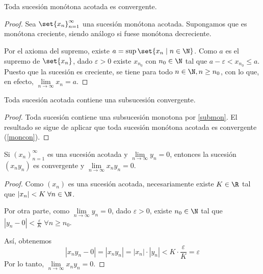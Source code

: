 \begin{proposition}
	\label{moncon}
	Toda sucesión monótona acotada es convergente.
\end{proposition}
\begin{proof}
	Sea \(\set{x_n}^{\infty}_{n = 1} \) una sucesión monótona acotada. Supongamos que es monótona creciente, siendo análogo si fuese monótona decreciente. 
	
	Por el axioma del supremo, existe \(a = \sup \set{x_n \mid n \in \N }\). Como \(a \) es el supremo de \(\set{x_n}\), dado \(\varepsilon > 0\) existe \(x_{n_0} \) con \(n_0 \in \N\) tal que \(a - \varepsilon < x_{n_0} \leq a\). Puesto que la sucesión es creciente, se tiene para todo \( n \in \N, n \geq  n_0\), con lo que, en efecto, \(\lim\limits_{n \to \infty} x_n = a\).   
\end{proof}
\begin{theorem}
	Toda sucesión acotada contiene una subsucesión convergente.
\end{theorem}
\begin{proof}
	Toda sucesión contiene una subsucesión monotona por \ref{submon}. El resultado se sigue de aplicar que toda sucesión monótona acotada es convergente (\ref{moncon}). 
\end{proof}

\begin{theorem}
	Si \((x_n)^{\infty}_{n=1} \) es una sucesión acotada y \(\lim\limits_{n \to \infty} y_n = 0 \), entonces la sucesión \((x_n y_n )\) es convergente y \(\lim\limits_{n \to \infty} x_n y_n = 0 \).
\end{theorem}
\begin{proof}
	Como \((x_n )\) es una sucesión acotada, necesariamente existe \(K \in \R \) tal que \(\left\vert x_n  \right\vert < K \; \forall n \in \N \).
	
	Por otra parte, como \(\lim\limits_{n \to \infty} y_n = 0\), dado \(\varepsilon > 0 \), existe \(n_0 \in \N \) tal que \(\left\vert y_n - 0  \right\vert < \frac{\varepsilon}{K} \; \forall n \geq n_0\).
	
	Así, obtenemos
	\[
		\left\vert x_n y_n - 0  \right\vert = \left\vert x_n y_n  \right\vert = \left\vert x_n  \right\vert \cdot \left\vert y_n  \right\vert < K \cdot \frac{\varepsilon}{K} = \varepsilon
	\]
	Por lo tanto, \(\lim\limits_{n \to \infty} x_n y_n = 0 \).
\end{proof}


